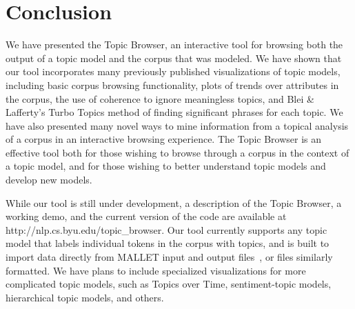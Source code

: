 \documentclass{article}
\begin{document}
\section{Conclusion}

We have presented the Topic Browser, an interactive tool for browsing both the
output of a topic model and the corpus that was modeled.  We have shown that
our tool incorporates many previously published visualizations of topic models,
including basic corpus browsing functionality, plots of trends over attributes
in the corpus, the use of coherence to ignore meaningless topics, and Blei \&
Lafferty's Turbo Topics method of finding significant phrases for each topic.
We have also presented many novel ways to mine information from a topical
analysis of a corpus in an interactive browsing experience.  The Topic Browser
is an effective tool both for those wishing to browse through a corpus in the
context of a topic model, and for those wishing to better understand topic
models and develop new models.


While our tool is still under development, a description of the Topic Browser,
a working demo, and the current version of the code are available at
http://nlp.cs.byu.edu/topic\_browser.  Our tool currently supports any topic
model that labels individual tokens in the corpus with topics, and is built to
import data directly from MALLET input and output files~\cite{mallet}, or files
similarly formatted.  We have plans to include specialized visualizations for
more complicated topic models, such as Topics over Time, sentiment-topic
models, hierarchical topic models, and others.



\end{document}
